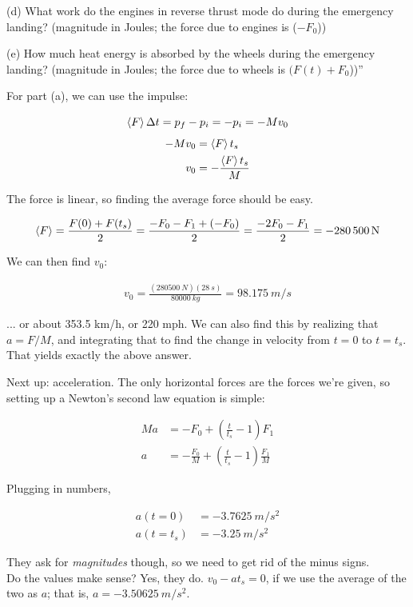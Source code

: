\documentclass[8.01x]{subfiles}
\begin{document}
(d) What work do the engines in reverse thrust mode do during the emergency landing?
(magnitude in Joules; the force due to engines is ($-F_0$))

(e) How much heat energy is absorbed by the wheels during the emergency landing?
(magnitude in Joules; the force due to wheels is $(F(t)+F_0$))''

For part (a), we can use the impulse:

\begin{equation}
\Braket{F} \Delta t = p_f - p_i = -p_i = - M v_0
\end{equation}
\begin{align}
-M v_0 &= \Braket{F} t_s\\
v_0 &= -\frac{\Braket{F} t_s}{M}
\end{align}

The force is linear, so finding the average force should be easy.

\begin{align}
\Braket{F} = \frac{F(0) + F(t_s)}{2} = \frac{-F_0 - F_1 + (- F_0)}{2} = \frac{-2 F_0 - F_1}{2} = \SI{-280500}{N}
\end{align}

We can then find $v_0$:

\begin{align}
v_0 = \frac{(\SI{280500}{N})(\SI{28}{s})}{\SI{80000}{kg}} = \SI{98.175}{m/s}
\end{align}

... or about 353.5 km/h, or 220 mph. We can also find this by realizing that $a = F/M$, and integrating that to find the change in velocity from $t=0$ to $t=t_s$. That yields exactly the above answer.

Next up: acceleration. The only horizontal forces are the forces we're given, so setting up a Newton's second law equation is simple:

\begin{align}
M a &= -F_0 + \left( \frac{t}{t_s} - 1\right) F_1\\
a &= -\frac{F_0}{M} + \left( \frac{t}{t_s} - 1\right) \frac{F_1}{M}
\end{align}

Plugging in numbers,

\begin{align}
a(t=0) &= \SI{-3.7625}{m/s^2}\\
a(t=t_s) &= \SI{-3.25}{m/s^2}
\end{align}

They ask for \emph{magnitudes} though, so we need to get rid of the minus signs.\\
Do the values make sense? Yes, they do. $v_0 - a t_s = 0$, if we use the average of the two as $a$; that is, $a = \SI{-3.50625}{m/s^2}$.
\end{document}
